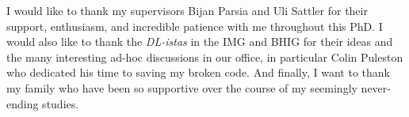 I would like to thank my supervisors Bijan Parsia and Uli Sattler for their support, enthusiasm, and incredible patience with me throughout this PhD. I would also like to thank the \emph{DL-istas} in the IMG and BHIG for their ideas and the many interesting ad-hoc discussions in our office, in particular Colin Puleston who dedicated his time to saving my broken code. And finally, I want to thank my family who have been so supportive over the course of my seemingly never-ending studies.